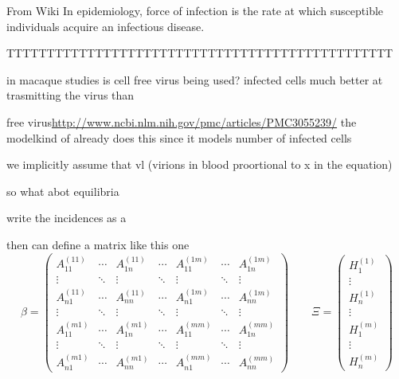 \documentclass[DIV=15]{scrartcl}
\begin{document}
From Wiki
  In epidemiology, force of infection  is the rate at which susceptible individuals acquire an infectious disease.
  
  
  
  











TTTTTTTTTTTTTTTTTTTTTTTTTTTTTTTTTTTTTTTTTTTTTTTT

in macaque studies is cell  free virus being used?
infected cells much better at trasmitting the virus than 

free virus\url{http://www.ncbi.nlm.nih.gov/pmc/articles/PMC3055239/}  the modelkind of already does this since it models number of infected cells


we implicitly assume that vl (virions in blood proortional to x in the equation)

so  what abot equilibria
 

write the incidences as a

then can define a matrix like this one
 \begin{equation}
\beta = \begin{pmatrix}
A_{11}^{(11)}& \cdots & A_{1n}^{(11)} & \cdots & A_{11}^{(1m)} & \cdots & A_{1n}^{(1m)} \\
\vdots & \ddots & \vdots & \ddots & \vdots & \ddots & \vdots \\ 
 A_{n1}^{(11)}& \cdots & A_{nn}^{(11)} & \cdots & A_{n1}^{(1m)} & \cdots & A_{nn}^{(1m)} \\
\vdots & \ddots & \vdots & \ddots & \vdots & \ddots & \vdots \\  
A_{11}^{(m1)}& \cdots & A_{1n}^{(m1)} & \cdots & A_{11}^{(mm)} & \cdots & A_{1n}^{(mm)} \\
\vdots & \ddots & \vdots & \ddots & \vdots & \ddots & \vdots \\ 
 A_{n1}^{(m1)}& \cdots & A_{nn}^{(m1)} & \cdots & A_{n1}^{(mm)} & \cdots & A_{nn}^{(mm)}
\end{pmatrix} \qquad
\Xi =\begin{pmatrix} H_{1}^{(1)}\\ \vdots \\ H_n^{(1)} \\ \vdots \\ H_1^{(m)}  \\ \vdots \\ H_n^{(m)} \end{pmatrix} 
\label{gamma}
\end{equation}
\end{document}

